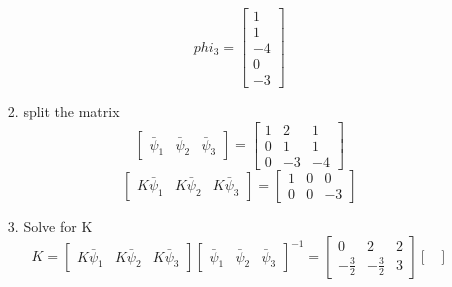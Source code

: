 \begin{enumerate}
\begin{enumerate}
\begin{enumerate}
\begin{equation}
        \end{equation}
        \begin{equation}
          phi_3 =
          \begin{bmatrix}
            1 \\
            1 \\
            -4 \\
            0 \\
            -3
          \end{bmatrix}
        \end{equation}
      \item split the matrix
        \begin{equation}
          \begin{bmatrix}
            \bar \psi_1 & \bar \psi_2 & \bar \psi_3
          \end{bmatrix} =
          \begin{bmatrix}
            1 & 2 & 1 \\
            0 & 1 & 1 \\
            0 & -3 & -4
          \end{bmatrix}
        \end{equation}
        \begin{equation}
          \begin{bmatrix}
            K\bar \psi_1 & K\bar \psi_2 & K\bar \psi_3
          \end{bmatrix} = 
          \begin{bmatrix}
            1 & 0 & 0 \\
            0 & 0 & -3
          \end{bmatrix}
        \end{equation}
      \item Solve for K
        \begin{equation}
          K = 
          \begin{bmatrix}
            K\bar \psi_1 & K\bar \psi_2 & K\bar \psi_3
          \end{bmatrix}
          \begin{bmatrix}
            \bar \psi_1 & \bar \psi_2 & \bar \psi_3
          \end{bmatrix}^{-1} =
          \begin{bmatrix}
            0 & 2 & 2 \\
            -\frac 3 2 & -\frac 3 2 & 3
          \end{bmatrix}
          \begin{bmatrix}

\end{bmatrix}
\end{equation}
\end{enumerate}
\end{enumerate}
\end{enumerate}
